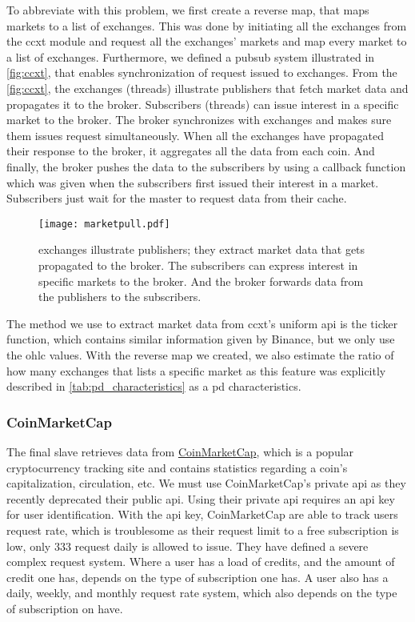 To abbreviate with this problem, we first create a reverse map, that maps markets to a list of exchanges. This was done by initiating all the exchanges from the ccxt module and request all the exchanges' markets and map every market to a list of exchanges. Furthermore, we defined a \ac{pubsub} system illustrated in \autoref{fig:ccxt}, that enables synchronization of request issued to exchanges. From the \autoref{fig:ccxt}, the exchanges (threads) illustrate publishers that fetch market data and propagates it to the broker. Subscribers (threads) can issue interest in a specific market to the broker. The broker synchronizes with exchanges and makes sure them issues request simultaneously. When all the exchanges have propagated their response to the broker, it aggregates all the data from each coin. And finally, the broker pushes the data to the subscribers by using a callback function which was given when the subscribers first issued their interest in a market. Subscribers just wait for the master to request data from their cache.

\begin{figure}
    \centering
    \texttt{[image: marketpull.pdf]}
    \caption[\project's Publish/Subscribe system]{exchanges illustrate publishers; they extract market data that gets propagated to the broker. The subscribers can express interest in specific markets to the broker. And the broker forwards data from the publishers to the subscribers.}
    \label{fig:ccxt}
\end{figure}

The method we use to extract market data from ccxt's uniform \ac{api} is the ticker function, which contains similar information given by Binance, but we only use the  \ac{ohlc} values. With the reverse map we created, we also estimate the ratio of how many exchanges that lists a specific market as this feature was explicitly described in \autoref{tab:pd_characteristics} as a \ac{pd} characteristics.

\subsubsection{CoinMarketCap}
The final slave retrieves data from \href{https://coinmarketcap.com/}{CoinMarketCap}, which is a popular cryptocurrency tracking site and contains statistics regarding a coin's capitalization, circulation, etc. We must use CoinMarketCap's private \ac{api} as they recently deprecated their public \ac{api}. Using their private \ac{api} requires an \ac{api} key for user identification. With the \ac{api} key, CoinMarketCap are able to track users request rate, which is troublesome as their request limit to a free subscription is low, only $333$ request daily is allowed to issue. They have defined a severe complex request system. Where a user has a load of credits, and the amount of credit one has, depends on the type of subscription one has. A user also has a daily, weekly, and monthly request rate system, which also depends on the type of subscription on have. 

